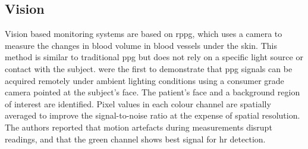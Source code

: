 \documentclass[11pt, parskip=half*,twoside=false]{scrbook}
\begin{document}
\subsection{Vision}
Vision based monitoring systems are based on \gls{rppg}, which uses a camera to measure the changes in blood volume in blood vessels under the skin. This method is similar to traditional \gls{ppg} but does not rely on a specific light source or contact with the subject. \citet{verkruysseRemotePlethysmographicImaging2008} were the first to demonstrate that \gls{ppg} signals can be acquired remotely under ambient lighting conditions using a consumer grade camera pointed at the subject's face. The patient's face and a background region of interest are identified. Pixel values in each colour channel are spatially averaged to improve the signal-to-noise ratio at the expense of spatial resolution. The authors reported that motion artefacts during measurements disrupt readings, and that the green channel shows best signal for \gls{hr} detection.
\end{document}

